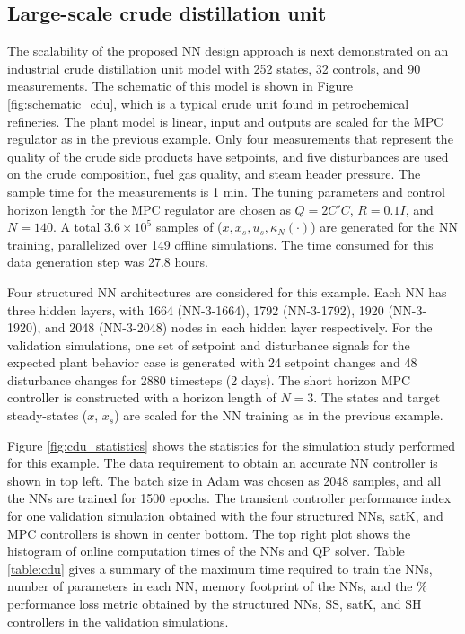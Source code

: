 \documentclass[preprint,5p, twocolumn, authoryear]{elsarticle}
\begin{document}
\subsection{Large-scale crude distillation unit}

The scalability of the proposed NN design 
approach is next demonstrated on an industrial crude 
distillation unit model \citep*{pannocchia:rawlings:wright:2007} 
with 252 states, 32 controls, and 90 measurements. The 
schematic of this model is shown in Figure \ref{fig:schematic_cdu}, 
which is a typical crude unit found in petrochemical refineries.
The plant model is linear, input and outputs are scaled 
for the MPC regulator as in the previous example.
Only four measurements that represent 
the quality of the crude side products have setpoints, 
and five disturbances are used on the crude composition, 
fuel gas quality, and steam header pressure. 
The sample time for the measurements is 1 min. The tuning 
parameters and control horizon length for the 
MPC regulator are chosen as $Q = 2C'C$, $R = 0.1I$, 
and $N = 140$. A total $3.6 \times 10^5$ 
samples of ($x, x_s, u_s, \kappa_N(\cdot)$)
are generated for the NN training, parallelized over 
149 offline simulations. The time consumed 
for this data generation step was 
27.8 hours.

Four structured NN architectures 
are considered for this example. Each NN
has three hidden layers, with 
1664 (NN-3-1664), 1792 (NN-3-1792), 
1920 (NN-3-1920), and 2048 (NN-3-2048) 
nodes in each hidden layer respectively. 
For the validation simulations, one set of
setpoint and disturbance signals for the expected 
plant behavior case is generated
with 24 setpoint changes and 48 disturbance changes 
for 2880 timesteps (2 days). 
The short horizon MPC controller is constructed with a 
horizon length of $N = 3$. 
The states and target steady-states 
($x$, $x_s$) are scaled for the NN training
as in the previous example. 

Figure \ref{fig:cdu_statistics} shows the 
statistics for the simulation study performed for this 
example.
The data requirement to obtain 
an accurate NN controller is shown in top left.
The batch size 
in Adam was chosen as 2048 samples, and all the NNs 
are trained for 1500 epochs.
The transient controller performance index 
for one validation simulation
obtained with the four structured NNs,
satK, and MPC controllers is shown in center bottom.
The top right plot shows the 
histogram of online computation times 
of the NNs and QP solver.
Table \ref{table:cdu} gives a summary of 
the maximum time required to train the NNs, number of parameters
in each NN, memory footprint of the NNs, and 
the $\%$ performance loss metric obtained by 
the structured NNs, SS, satK, and SH 
controllers in the validation simulations. 
\end{document}
